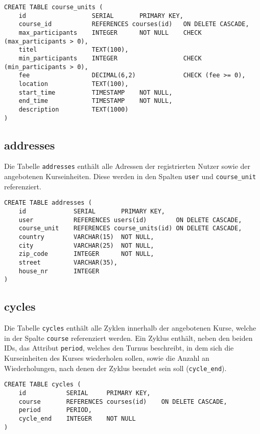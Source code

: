 \begin{verbatim}
CREATE TABLE course_units (
    id                  SERIAL       PRIMARY KEY,
    course_id           REFERENCES courses(id)   ON DELETE CASCADE,
    max_participants    INTEGER      NOT NULL    CHECK (max_participants > 0),
    titel               TEXT(100),
    min_participants    INTEGER                  CHECK (min_participants > 0),
    fee                 DECIMAL(6,2)             CHECK (fee >= 0),
    location            TEXT(100),
    start_time          TIMESTAMP    NOT NULL,
    end_time            TIMESTAMP    NOT NULL,
    description         TEXT(1000)
)
\end{verbatim}

\subsection{addresses}
Die Tabelle \texttt{addresses} enthält alle Adressen der registrierten Nutzer sowie der angebotenen Kurseinheiten. Diese werden in den Spalten \texttt{user} und \texttt{course\_unit} referenziert.

\begin{verbatim}
CREATE TABLE addresses (
    id             SERIAL       PRIMARY KEY,
    user           REFERENCES users(id)        ON DELETE CASCADE,
    course_unit    REFERENCES course_units(id) ON DELETE CASCADE,
    country        VARCHAR(15)  NOT NULL,
    city           VARCHAR(25)  NOT NULL,
    zip_code       INTEGER      NOT NULL,
    street         VARCHAR(35),
    house_nr       INTEGER
)
\end{verbatim}

\subsection{cycles}
Die Tabelle \texttt{cycles} enthält alle Zyklen innerhalb der angebotenen Kurse, welche in der Spalte \texttt{course} referenziert werden. Ein Zyklus enthält, neben den beiden IDs, das Attribut \texttt{period}, welches den Turnus beschreibt, in dem sich die Kurseinheiten des Kurses wiederholen sollen, sowie die Anzahl an Wiederholungen, nach denen der Zyklus beendet sein soll (\texttt{cycle\_end}).

\begin{verbatim}
CREATE TABLE cycles (
    id           SERIAL     PRIMARY KEY,
    course       REFERENCES courses(id)    ON DELETE CASCADE,
    period       PERIOD,
    cycle_end    INTEGER    NOT NULL
)
\end{verbatim}

